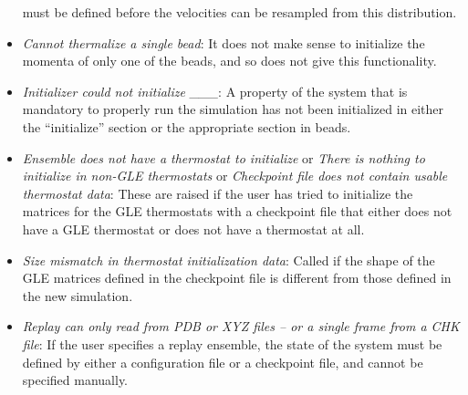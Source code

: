 \documentclass[11pt,english,fleqn]{report}
\begin{document}
\begin{itemize}
must be defined before the velocities can be resampled from this distribution.
\item \emph{Cannot thermalize a single bead}: It does not make sense to
initialize the momenta of only one of the beads, and so \ipi does
not give this functionality.
\item \emph{Initializer could not initialize \_\_\_}: A property of the
system that is mandatory to properly run the simulation has not been
initialized in either the {}``initialize'' section or the appropriate
section in beads.
\item \emph{Ensemble does not have a thermostat to initialize} or \emph{There is nothing to initialize in non-GLE thermostats} or \emph{Checkpoint file does not contain usable thermostat data}:
These are raised if the user has tried to initialize the matrices
for the GLE thermostats with a checkpoint file that either does not
have a GLE thermostat or does not have a thermostat at all.
\item \emph{Size mismatch in thermostat initialization data}: Called if
the shape of the GLE matrices defined in the checkpoint file is different
from those defined in the new simulation. 
\item \emph{Replay can only read from PDB or XYZ files -- or a single frame from a CHK file}:
If the user specifies a replay ensemble, the state of the system must
be defined by either a configuration file or a checkpoint file, and
cannot be specified manually.
\end{itemize}
\end{document}
